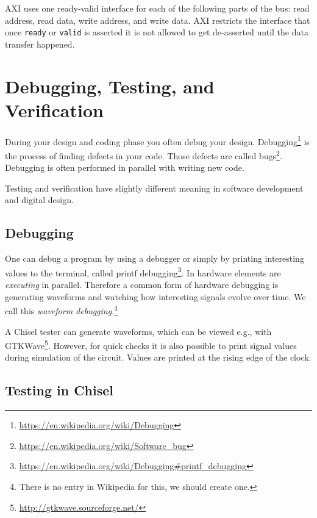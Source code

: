 \documentclass[%
    10pt,
    headinclude, footexclude,
    openright, %
    notitlepage,
    cleardoubleempty,
    headsepline,
    pointlessnumbers,
    bibtotoc, idxtotoc,
    ]{scrbook}
\newcommand{\code}[1]{{\small{\texttt{#1}}}}
\newcommand{\todo}[1]{{\emph{TODO: #1}}}
\newcommand{\myref}[2]{\href{#1}{#2}}
\renewcommand{\myref}[2]{{#2}{\footnote{\url{#1}}}}
\renewcommand{\todo}[1]{}
\begin{document}
AXI uses one ready-valid interface for each of the following parts of the bus:
read address, read data, write address, and write data. AXI restricts the interface
that once \code{ready} or \code{valid} is asserted it is not allowed to get de-asserted
until the data transfer happened.

\todo{Read and cite AXI, and check if the above is true}

\todo{Reconsider writing the testing chapter}

\chapter{Debugging, Testing, and Verification}
\label{chap:testing}


During your design and coding phase you often debug your design.
\myref{https://en.wikipedia.org/wiki/Debugging}{Debugging} is the process of
finding defects in your code. Those defects are called
\myref{https://en.wikipedia.org/wiki/Software_bug}{bugs}.
Debugging is often performed in parallel with writing new code.

Testing and verification have slightly different meaning in software development
and digital design.

\section{Debugging}

One can debug a program by using a debugger or simply by printing interesting
values to the terminal, called \myref{https://en.wikipedia.org/wiki/Debugging\#printf\_debugging}{printf debugging}.
In hardware elements are \emph{executing} in parallel. Therefore a common form of hardware
debugging is generating waveforms and watching how interesting signals evolve over time.
We call this \emph{waveform debugging}.\footnote{There is no entry in Wikipedia for this,
we should create one.}

A Chisel tester can generate waveforms, which can be viewed e.g., with \myref{http://gtkwave.sourceforge.net/}{GTKWave}.
However, for quick checks it is also possible to print signal values during simulation of the circuit.
Values are printed at the rising edge of the clock.


\section{Testing in Chisel}
\end{document}
